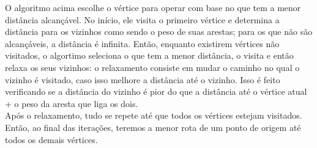 \begin{algorithm}
  \caption{Algoritmo de Dijkstra}
  \begin{algorithmic}[0]
    \Statex
        \Else
        \EndIf
      \EndFor
          \EndIf
        \EndFor
      \EndWhile
      \State {}
    \EndFunction
  \end{algorithmic}
\end{algorithm}
\FloatBarrier

O algoritmo acima escolhe o vértice para operar com base no que tem a
menor distância alcançável. No início, ele visita o primeiro vértice
e determina a distância para os vizinhos como sendo o peso de suas
arestas; para os que não são alcançáveis, a distância é infinita.
Então, enquanto existirem vértices não visitados, o algortimo
seleciona o que tem a menor distância, o visita e então relaxa os
seus vizinhos: o relaxamento consiste em mudar o caminho no qual o
vizinho é visitado, caso isso melhore a distância até o vizinho. Isso
é feito verificando se a distância do vizinho é pior do que a
distância até o vértice atual + o peso da aresta que liga os dois. \\
Após o relaxamento, tudo se repete até que todos os vértices estejam
visitados. Então, ao final das iterações, teremos a menor rota de um
ponto de origem até todos os demais vértices.

